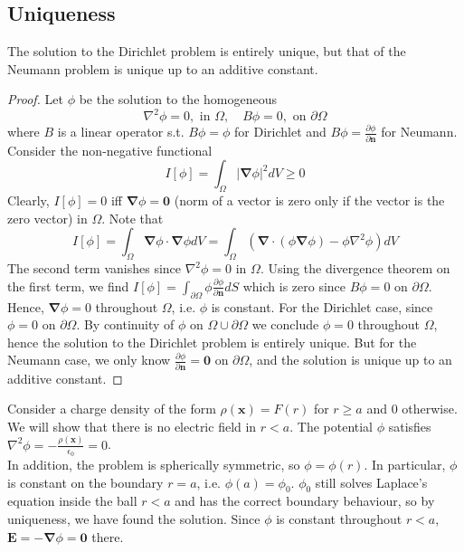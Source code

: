 \documentclass[a4paper]{article}
\begin{document}
\subsection{Uniqueness}
\begin{thm}
The solution to the Dirichlet problem is entirely unique, but that of the Neumann problem is unique up to an additive constant.
\end{thm}
\begin{proof}
Let $\phi$ be the solution to the homogeneous
$$\nabla^2\phi=0,\text{ in }\Omega,\quad B\phi=0,\text{ on }\partial\Omega$$
where $B$ is a linear operator s.t. $B\phi=\phi$ for Dirichlet and $B\phi=\frac{\partial\phi}{\partial\mathbf{n}}$ for Neumann. Consider the non-negative functional
$$I[\phi]=\int_\Omega|\boldsymbol{\nabla}\phi|^2dV\geq0$$
Clearly, $I[\phi]=0$ iff $\boldsymbol{\nabla}\phi=\boldsymbol{0}$ (norm of a vector is zero only if the vector is the zero vector) in $\Omega$. Note that
$$I[\phi]=\int_\Omega\boldsymbol{\nabla}\phi\cdot\boldsymbol{\nabla}\phi dV=\int_\Omega(\boldsymbol{\nabla}\cdot(\phi\boldsymbol{\nabla}\phi)-\phi\nabla^2\phi)dV$$
The second term vanishes since $\nabla^2\phi=0$ in $\Omega$. Using the divergence theorem on the first term, we find $I[\phi]=\int_{\partial\Omega}\phi\frac{\partial\phi}{\partial\mathbf{n}}dS$ which is zero since $B\phi=0$ on $\partial\Omega$. Hence, $\boldsymbol{\nabla}\phi=0$ throughout $\Omega$, i.e. $\phi$ is constant. For the Dirichlet case, since $\phi=0$ on $\partial\Omega$. By continuity of $\phi$ on $\Omega\cup\partial\Omega$ we conclude $\phi=0$ throughout $\Omega$, hence the solution to the Dirichlet problem is entirely unique. But for the Neumann case, we only know $\frac{\partial\phi}{\partial\mathbf{n}}=\boldsymbol{0}$ on $\partial\Omega$, and the solution is unique up to an additive constant. 
\end{proof}
\begin{eg}
Consider a charge density of the form $\rho(\mathbf{x})=F(r)$ for $r\geq a$ and 0 otherwise. We will show that there is no electric field in $r<a$. The potential $\phi$ satisfies $\nabla^2\phi=-\frac{\rho(\mathbf{x})}{\epsilon_0}=0$.\\[5pt]
In addition, the problem is spherically symmetric, so $\phi=\phi(r)$. In particular, $\phi$ is constant on the boundary $r=a$, i.e. $\phi(a)=\phi_0$. $\phi_0$ still solves Laplace's equation inside the ball $r<a$ and has the correct boundary behaviour, so by uniqueness, we have found the solution. Since $\phi$ is constant throughout $r<a$, $\mathbf{E}=-\boldsymbol{\nabla}\phi=\boldsymbol{0}$ there.
\end{eg}
\end{document}
